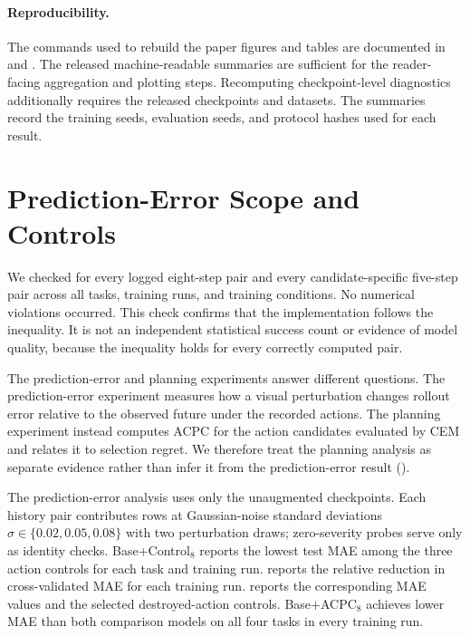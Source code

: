 \paragraph{Reproducibility.}
The commands used to rebuild the paper figures and tables are documented in
 and
. The
released machine-readable summaries are sufficient for the reader-facing
aggregation and plotting steps. Recomputing checkpoint-level diagnostics
additionally requires the released checkpoints and datasets. The summaries
record the training seeds, evaluation seeds, and protocol hashes used for each
result.



\FloatBarrier


\FloatBarrier
\section{Prediction-Error Scope and Controls}\label{sec:appendix-p1-controls}

We checked  for every logged eight-step pair
and every candidate-specific five-step pair across all tasks, training runs,
and training conditions. No numerical violations occurred. This check
confirms that the implementation follows the inequality. It is not an independent statistical success count
or evidence of model quality, because the inequality holds for every correctly
computed pair.

The prediction-error and planning experiments answer different questions. The
prediction-error experiment measures how a visual perturbation changes
rollout error relative to the observed future under the recorded actions. The
planning experiment instead computes ACPC for the action candidates evaluated
by CEM and relates it to selection regret. We therefore treat the planning
analysis as separate evidence rather than infer it from the prediction-error
result ().

The prediction-error analysis uses only the unaugmented checkpoints.
Each history pair contributes rows at Gaussian-noise standard deviations
$\sigma\in\{0.02,0.05,0.08\}$ with two perturbation draws; zero-severity probes
serve only as identity checks.
Base+Control$_8$ reports the lowest test MAE
among the three action controls for each task and training run.
 reports the relative reduction in
cross-validated MAE for each training run.
 reports the corresponding MAE values
and the selected destroyed-action controls. Base+ACPC$_8$ achieves lower MAE
than both comparison models on all four tasks in every training run.

